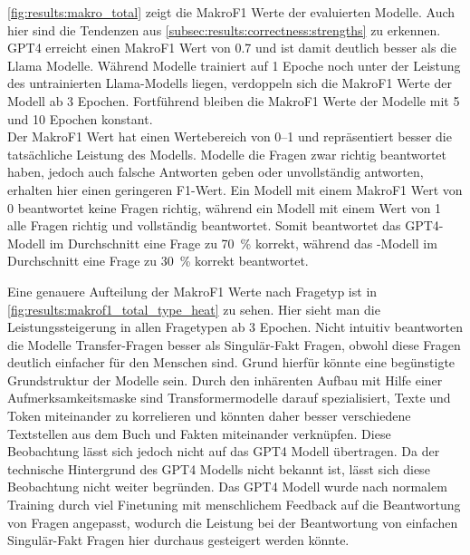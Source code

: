 \cref{fig:results:makro_total} zeigt die MakroF1 Werte der evaluierten Modelle.
Auch hier sind die Tendenzen aus \cref{subsec:results:correctness:strengths} zu erkennen.
GPT4 erreicht einen MakroF1 Wert von \num{0.7} und ist damit deutlich besser als die Llama Modelle.
Während Modelle trainiert auf 1 Epoche noch unter der Leistung des untrainierten Llama-Modells liegen, verdoppeln sich die MakroF1 Werte der Modell ab 3 Epochen.
Fortführend bleiben die MakroF1 Werte der Modelle mit 5 und 10 Epochen konstant.\\

Der MakroF1 Wert hat einen Wertebereich von \numrange{0}{1} und repräsentiert besser die tatsächliche Leistung des Modells.
Modelle die Fragen zwar richtig beantwortet haben, jedoch auch falsche Antworten geben oder unvollständig antworten, erhalten hier einen geringeren F1-Wert.
Ein Modell mit einem MakroF1 Wert von \num{0} beantwortet keine Fragen richtig, während ein Modell mit einem Wert von \num{1} alle Fragen richtig und vollständig beantwortet.
Somit beantwortet das GPT4-Modell im Durchschnitt eine Frage zu \SI{70}{\percent} korrekt, während das \lea-Modell im Durchschnitt eine Frage zu \SI{30}{\percent} korrekt beantwortet.\\


Eine genauere Aufteilung der MakroF1 Werte nach Fragetyp  ist in \cref{fig:results:makrof1_total_type_heat} zu sehen.
Hier sieht man die Leistungssteigerung in allen Fragetypen ab 3 Epochen.
Nicht intuitiv beantworten die Modelle Transfer-Fragen besser als Singulär-Fakt Fragen, obwohl diese Fragen deutlich einfacher für den Menschen sind.
Grund hierfür könnte eine begünstigte Grundstruktur der Modelle sein.
Durch den inhärenten Aufbau mit Hilfe einer Aufmerksamkeitsmaske sind Transformermodelle darauf spezialisiert, Texte und Token miteinander zu korrelieren und könnten daher besser verschiedene Textstellen aus dem Buch und Fakten miteinander verknüpfen.
Diese Beobachtung lässt sich jedoch nicht auf das GPT4 Modell übertragen.
Da der technische Hintergrund des GPT4 Modells nicht bekannt ist, lässt sich diese Beobachtung nicht weiter begründen.
Das GPT4 Modell wurde nach normalem Training durch viel Finetuning mit menschlichem Feedback auf die Beantwortung von Fragen angepasst, wodurch die Leistung bei der Beantwortung von einfachen Singulär-Fakt Fragen hier durchaus gesteigert werden könnte.\\

